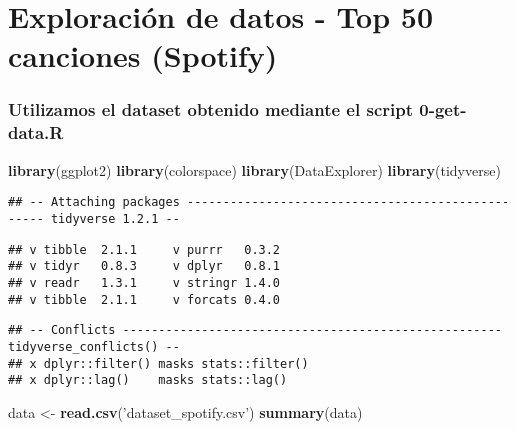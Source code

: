 \documentclass[]{article}
\title{}
\author{}
\date{}
\newenvironment{Shaded}{\begin{snugshade}}{\end{snugshade}}
\newcommand{\KeywordTok}[1]{\textcolor[rgb]{0.13,0.29,0.53}{\textbf{#1}}}
\newcommand{\StringTok}[1]{\textcolor[rgb]{0.31,0.60,0.02}{#1}}
\newcommand{\NormalTok}[1]{#1}
\begin{document}
\section{Exploración de datos - Top 50 canciones
(Spotify)}\label{exploracion-de-datos---top-50-canciones-spotify}

\subsubsection{Utilizamos el dataset obtenido mediante el script
0-get-data.R}\label{utilizamos-el-dataset-obtenido-mediante-el-script-0-get-data.r}

\begin{Shaded}
\begin{Highlighting}[]
\KeywordTok{library}\NormalTok{(ggplot2)}
\KeywordTok{library}\NormalTok{(colorspace)}
\KeywordTok{library}\NormalTok{(DataExplorer)}
\KeywordTok{library}\NormalTok{(tidyverse)}
\end{Highlighting}
\end{Shaded}

\begin{verbatim}
## -- Attaching packages -------------------------------------------------- tidyverse 1.2.1 --
\end{verbatim}

\begin{verbatim}
## v tibble  2.1.1     v purrr   0.3.2
## v tidyr   0.8.3     v dplyr   0.8.1
## v readr   1.3.1     v stringr 1.4.0
## v tibble  2.1.1     v forcats 0.4.0
\end{verbatim}

\begin{verbatim}
## -- Conflicts ----------------------------------------------------- tidyverse_conflicts() --
## x dplyr::filter() masks stats::filter()
## x dplyr::lag()    masks stats::lag()
\end{verbatim}

\begin{Shaded}
\begin{Highlighting}[]
\NormalTok{data <-}\StringTok{ }\KeywordTok{read.csv}\NormalTok{(}\StringTok{'dataset_spotify.csv'}\NormalTok{)}
\KeywordTok{summary}\NormalTok{(data)}
\end{Highlighting}
\end{Shaded}
\end{document}
